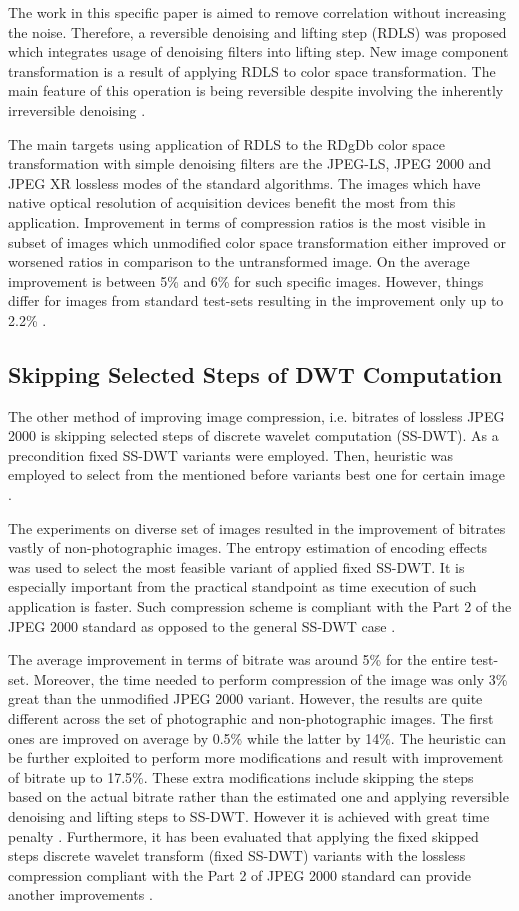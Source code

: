 The work in this specific paper is aimed to remove correlation without increasing the noise.
Therefore, a reversible denoising and lifting step (RDLS) was proposed which integrates
usage of denoising filters into lifting step. New image component transformation is a result
of applying RDLS to color space transformation. The main feature of this operation is
being reversible despite involving the inherently irreversible denoising \cite{denoising}.

The main targets using application of RDLS to the RDgDb color space transformation with
simple denoising filters are the JPEG-LS, JPEG 2000 and JPEG XR lossless modes of the
standard algorithms.
The images which have native optical resolution of acquisition devices benefit the most
from this application. Improvement in terms of compression ratios is the most visible
in subset of images which unmodified color space transformation either improved or worsened
ratios in comparison to the untransformed image. On the average improvement is between
5\% and 6\% for such specific images. However, things differ for images from standard
test-sets resulting in the improvement only up to 2.2\% \cite{denoising}.


\subsection{Skipping Selected Steps of DWT Computation}

The other method of improving image compression, i.e. bitrates of lossless JPEG 2000 is skipping
selected steps of discrete wavelet computation (SS-DWT). As a precondition fixed SS-DWT variants
were employed. Then, heuristic was employed to select from the mentioned before variants best
one for certain image \cite{skipping_dwt}.

The experiments on diverse set of images resulted in the improvement of bitrates vastly of
non-photographic images. The entropy estimation of encoding effects was used to select the most
feasible variant of applied fixed SS-DWT. It is especially important from the practical standpoint
as time execution of such application is faster. Such compression scheme is compliant with the Part 2
of the JPEG 2000 standard as opposed to the general SS-DWT case \cite{skipping_dwt}.

The average improvement in terms of bitrate was around 5\% for the entire test-set. Moreover,
the time needed to perform compression of the image was only 3\% great than the unmodified JPEG 2000
variant. However, the results are quite different across the set of photographic and non-photographic
images. The first ones are improved on average by 0.5\% while the latter by 14\%. The heuristic can
be further exploited to perform more modifications and result with improvement of bitrate up to 17.5\%.
These extra modifications include skipping the steps based on the actual bitrate rather than the
estimated one and applying reversible denoising and lifting steps to SS-DWT. However it is achieved with
great time penalty \cite{skipping_dwt}.
Furthermore, it has been evaluated that applying the fixed skipped steps discrete wavelet
transform (fixed SS-DWT) variants with the lossless compression compliant with the Part 2
of JPEG 2000 standard can provide another improvements \cite{practical_dwt}.
